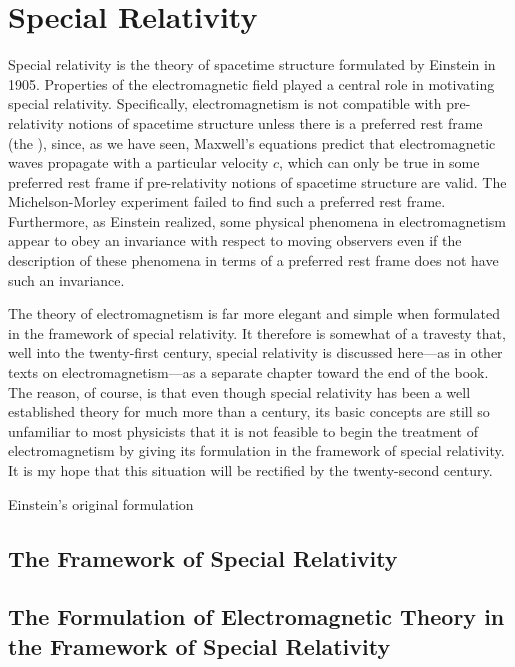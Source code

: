 \setcounter{chapter}{0}
\renewcommand{\thechapter}{8}
\chapter{Special Relativity}
\setcounter{equation}{0}	        %

Special relativity is the theory of spacetime structure formulated by Einstein in 1905. Properties of the electromagnetic field played a central role in motivating special relativity. Specifically, electromagnetism is not compatible with pre-relativity notions of spacetime structure unless there is a preferred rest frame (the ), since, as we have seen, Maxwell's equations predict that electromagnetic waves propagate with a particular velocity $c$, which can only be true in some preferred rest frame if pre-relativity notions of spacetime structure are valid. The Michelson-Morley experiment failed to find such a preferred rest frame. Furthermore, as Einstein realized, some physical phenomena in electromagnetism appear to obey an invariance with respect to moving observers even if the description of these phenomena in terms of a preferred rest frame does not have such an invariance.

The theory of electromagnetism is far more elegant and simple when formulated in the framework of special relativity. It therefore is somewhat of a travesty that, well into the twenty-first century, special relativity is discussed here---as in other texts on electromagnetism---as a separate chapter toward the end of the book. The reason, of course, is that even though special relativity has been a well established theory for much more than a century, its basic concepts are still so unfamiliar to most physicists that it is not feasible to begin the treatment of electromagnetism by giving its formulation in the framework of special relativity. It is my hope that this situation will be rectified by the twenty-second century.

Einstein's original formulation

\section{The Framework of Special Relativity}

\section{The Formulation of Electromagnetic Theory in the Framework of Special Relativity}

